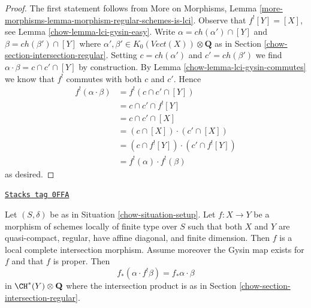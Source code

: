 \begin{proof}

The first statement follows from
More on Morphisms, Lemma
\ref{more-morphisms-lemma-morphism-regular-schemes-is-lci}.
Observe that $f^![Y] = [X]$, see Lemma \ref{chow-lemma-lci-gysin-easy}.
Write $\alpha = ch(\alpha') \cap [Y]$ and $\beta = ch(\beta') \cap [Y]$
where $\alpha', \beta' \in K_0(\textit{Vect}(X)) \otimes \mathbf{Q}$
as in Section \ref{chow-section-intersection-regular}.
Setting $c = ch(\alpha')$ and $c' = ch(\beta')$ we find
$\alpha \cdot \beta = c \cap c' \cap [Y]$ by construction.
By Lemma \ref{chow-lemma-lci-gysin-commutes} we know that $f^!$
commutes with both $c$ and $c'$. Hence
\begin{align*}
f^!(\alpha \cdot \beta)
& =
f^!(c \cap c' \cap [Y]) \\
& =
c \cap c' \cap f^![Y] \\
& =
c \cap c' \cap [X] \\
& =
(c \cap [X]) \cdot (c' \cap [X]) \\
& =
(c \cap f^![Y]) \cdot (c' \cap f^![Y]) \\
& =
f^!(\alpha) \cdot f^!(\beta)
\end{align*}
as desired.
\end{proof}

\begin{lemma}
\label{chow-lemma-projection-formula-regular}
\href{https://stacks.math.columbia.edu/tag/0FFA}{\texttt{Stacks tag 0FFA}}

Let $(S, \delta)$ be as in Situation \ref{chow-situation-setup}.
Let $f : X \to Y$ be a morphism of schemes locally of finite
type over $S$ such that both $X$ and $Y$ are quasi-compact,
regular, have affine diagonal, and finite dimension.
Then $f$ is a local complete intersection morphism.
Assume moreover the Gysin map exists for $f$
and that $f$ is proper. Then
$$
f_*(\alpha \cdot f^!\beta) = f_*\alpha \cdot \beta
$$
in $\CH^*(Y) \otimes \mathbf{Q}$ where the intersection product
is as in Section \ref{chow-section-intersection-regular}.
\end{lemma}

